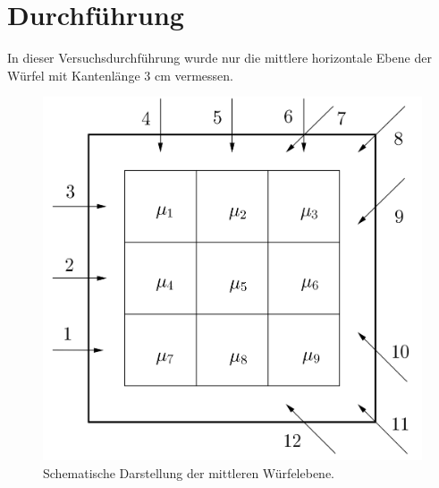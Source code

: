 

\section{Durchführung}
In dieser Versuchsdurchführung wurde nur die mittlere horizontale Ebene der Würfel mit Kantenlänge 
$3$ cm vermessen.

\begin{figure}[h]
\centering
\includegraphics[scale=0.18]{../skript/domi.jpg}
\caption{Schematische Darstellung der mittleren Würfelebene.}
\label{fig:Wuerfel}
\end{figure}

